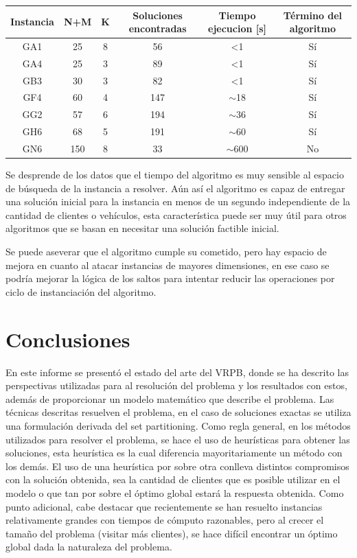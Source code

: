 \documentclass[letter, 10pt]{article}
\begin{document}
\begin{table}[H]
\begin{tabular}{|c|c|c|c|c|c|}
\hline
Instancia & N+M & K & Soluciones encontradas & Tiempo ejecucion {[}s{]} & Término del algoritmo \\ \hline
GA1 & 25  & 8 & 56  & \textless 1 & Sí \\ \hline
GA4 & 25  & 3 & 89  & \textless 1 & Sí \\ \hline
GB3 & 30  & 3 & 82  & \textless 1 & Sí \\ \hline
GF4 & 60  & 4 & 147 & $\sim$18    & Sí \\ \hline
GG2 & 57  & 6 & 194 & $\sim$36    & Sí \\ \hline
GH6 & 68  & 5 & 191 & $\sim$60    & Sí \\ \hline
GN6 & 150 & 8 & 33  & $\sim$600   & No \\ \hline
\end{tabular}
\end{table}

Se desprende de los datos que el tiempo del algoritmo es muy sensible al espacio de búsqueda de la instancia a resolver. Aún así el algoritmo es capaz de entregar una solución inicial para la instancia en menos de un segundo independiente de la cantidad de clientes o vehículos, esta característica puede ser muy útil para otros algoritmos que se basan en necesitar una solución factible inicial.

Se puede aseverar que el algoritmo cumple su cometido, pero hay espacio de mejora en cuanto al atacar instancias de mayores dimensiones, en ese caso se podría mejorar la lógica de los saltos para intentar reducir las operaciones por ciclo de instanciación del algoritmo.



\section{Conclusiones}
En este informe se presentó el estado del arte del VRPB, donde se ha descrito las perspectivas utilizadas para al resolución del problema y los resultados con estos, además de proporcionar un modelo matemático que describe el problema. Las técnicas descritas resuelven el problema, en el caso de soluciones exactas se utiliza una formulación derivada del set partitioning. Como regla general, en los métodos utilizados para resolver el problema, se hace el uso de heurísticas para obtener las soluciones, esta heurística es la cual diferencia mayoritariamente un método con los demás. El uso de una heurística por sobre otra conlleva distintos compromisos con la solución obtenida, sea la cantidad de clientes que es posible utilizar en el modelo o que tan por sobre el óptimo global estará la respuesta obtenida. Como punto adicional, cabe destacar que recientemente se han resuelto instancias relativamente grandes con tiempos de cómputo razonables, pero al crecer el tamaño del problema (visitar más clientes), se hace difícil encontrar un óptimo global dada la naturaleza del problema.
\end{document}
